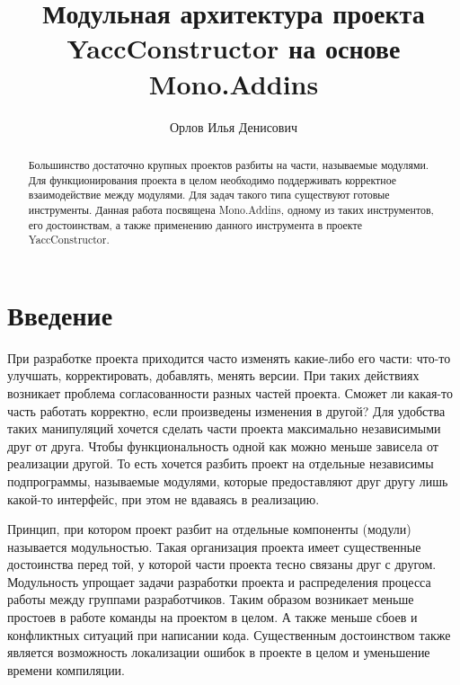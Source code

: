 \title{Модульная архитектура проекта YaccConstructor на основе Mono.Addins}
%

\author{Орлов Илья Денисович}
%
%
%

\maketitle

\begin{abstract}
Большинство  достаточно  крупных проектов разбиты на части, называемые
модулями.     Для    функционирования    проекта  в целом   необходимо
поддерживать    корректное    взаимодействие   между   модулями.   Для
задач  такого  типа  существуют  готовые  инструменты.  Данная  работа
посвящена Mono.Addins, одному из таких инструментов, его достоинствам,
а также применению данного инструмента в проекте YaccConstructor.
\end{abstract}

\section*{Введение}
При разработке проекта приходится часто изменять какие-либо его части: что-то улучшать, корректировать, добавлять, менять версии. При таких действиях возникает проблема согласованности разных частей проекта. Сможет ли какая-то часть работать корректно, если произведены изменения в другой? Для удобства таких манипуляций хочется сделать части проекта максимально независимыми друг от друга. Чтобы функциональность одной как можно меньше зависела от реализации другой. То есть хочется разбить проект на отдельные независимы подпрограммы, называемые модулями, которые предоставляют друг другу лишь какой-то интерфейс, при этом не вдаваясь в реализацию.

Принцип, при котором проект разбит на отдельные компоненты (модули) называется модульностью. Такая организация проекта имеет существенные достоинства перед той, у которой части проекта тесно связаны друг с другом. Модульность упрощает задачи разработки проекта и распределения процесса работы между группами разработчиков. Таким образом возникает меньше простоев в работе команды на проектом в целом. А также меньше сбоев и конфликтных ситуаций при написании кода. Существенным достоинством также является возможность локализации ошибок в проекте в целом и уменьшение времени компиляции.

